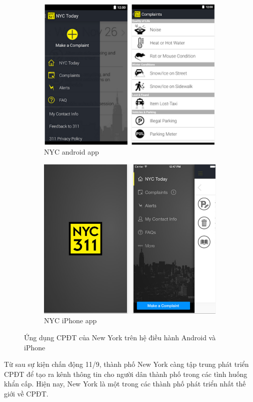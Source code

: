 \documentclass[a4paper]{article}
\begin{document}
\begin{figure}[h]
\centering
\begin{subfigure}{.5\textwidth}
  \centering
  \includegraphics[width=0.9\linewidth]{newyork_android.PNG}
  \caption{NYC android app}
\end{subfigure}%
\begin{subfigure}{.5\textwidth}
  \centering
  \includegraphics[width=0.9\linewidth]{newyork_iphones.PNG}
  \caption{NYC iPhone app}
  \label{fig:sub2}
\end{subfigure}
\caption{Ứng dụng CPĐT của New York trên hệ điều hành Android và iPhone}
\end{figure}

Từ sau sự kiện chấn động 11/9, thành phố New York càng tập trung phát triển CPĐT để tạo ra kênh thông tin cho người dân thành phố trong các tình huống khẩn cấp. Hiện nay, New York là một trong các thành phố phát triển nhất thế giới về CPĐT. 
\end{document}
